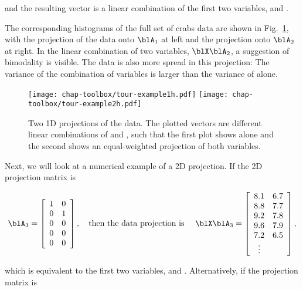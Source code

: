 \noindent and the resulting vector is a linear combination of the
first two variables,  and .

The corresponding histograms of the full set of crabs data
are shown in Fig.~\ref{tour1D-examples}, with the projection of the
data onto $\blA_1$ at left and the projection onto $\blA_2$ at right.
In the linear combination of two variables, $\blX\blA_2$, a suggestion
of bimodality is visible. The data is also more spread in this
projection: The variance of the combination of variables is
larger than the variance of  alone.

\begin{figure}[htp]
\centerline{
  {\texttt{[image: chap-toolbox/tour-example1h.pdf]}}
  {\texttt{[image: chap-toolbox/tour-example2h.pdf]}}
}
\caption[One-dimensional projections of the 
data]{Two 1D projections of the  data.  The
plotted vectors are different linear combinations of  and , such that the first plot shows
 alone and the second shows an equal-weighted
projection of both variables.}
\label{tour1D-examples}
\end{figure}

Next, we will look at a numerical example of a 2D projection.  If the
2D projection matrix is

\[
\blA_3 = \left[ \begin{array}{cc} 1 & 0\\ 0 & 1\\ 0 & 0\\ 0 & 0\\ 0 & 0 
\end{array} \right],
~~~ \mbox{then the data projection is}~~~~ \blX\blA_3 = \left[
\begin{array}{cc} 8.1 & 6.7 \\ 8.8  & 7.7 \\ 9.2 & 7.8 \\ 9.6 & 7.9 \\ 
7.2 & 6.5 \\ \vdots \end{array} \right] ,
\]

\noindent which is equivalent to the first two variables,  and .  Alternatively, if the projection matrix
is

